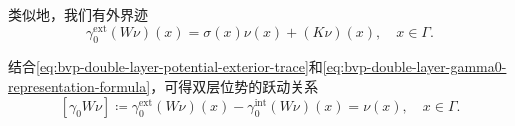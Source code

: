 类似地，我们有外界迹
\begin{equation}
  \label{eq:bvp-double-layer-potential-exterior-trace}
  \gamma_{0}^{\text{ext}} \left( W \nu \right)(x)
  = \sigma(x) \nu(x) + \left(K \nu \right)(x), \quad x \in \Gamma.
\end{equation}

结合\eqref{eq:bvp-double-layer-potential-exterior-trace}和\eqref{eq:bvp-double-layer-gamma0-representation-formula}，可得双层位势的跃动关系
\begin{equation}
  \label{eq:bvp-double-layer-gamma0-jumprelation}
  \left[ \gamma_{0} W \nu \right]
  \coloneqq \gamma_{0}^{\text{ext}} \left(W \nu \right)(x)
  - \gamma_{0}^{\text{int}} \left( W \nu \right)(x)
  = \nu(x), \quad x \in \Gamma.
\end{equation}

